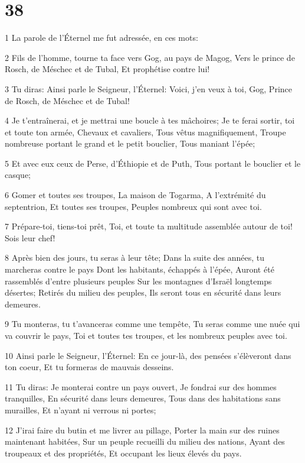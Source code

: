 \chapter{38}

\par 1 La parole de l'Éternel me fut adressée, en ces mots:
\par 2 Fils de l'homme, tourne ta face vers Gog, au pays de Magog, Vers le prince de Rosch, de Méschec et de Tubal, Et prophétise contre lui!
\par 3 Tu diras: Ainsi parle le Seigneur, l'Éternel: Voici, j'en veux à toi, Gog, Prince de Rosch, de Méschec et de Tubal!
\par 4 Je t'entraînerai, et je mettrai une boucle à tes mâchoires; Je te ferai sortir, toi et toute ton armée, Chevaux et cavaliers, Tous vêtus magnifiquement, Troupe nombreuse portant le grand et le petit bouclier, Tous maniant l'épée;
\par 5 Et avec eux ceux de Perse, d'Éthiopie et de Puth, Tous portant le bouclier et le casque;
\par 6 Gomer et toutes ses troupes, La maison de Togarma, A l'extrémité du septentrion, Et toutes ses troupes, Peuples nombreux qui sont avec toi.
\par 7 Prépare-toi, tiens-toi prêt, Toi, et toute ta multitude assemblée autour de toi! Sois leur chef!
\par 8 Après bien des jours, tu seras à leur tête; Dans la suite des années, tu marcheras contre le pays Dont les habitants, échappés à l'épée, Auront été rassemblés d'entre plusieurs peuples Sur les montagnes d'Israël longtemps désertes; Retirés du milieu des peuples, Ils seront tous en sécurité dans leurs demeures.
\par 9 Tu monteras, tu t'avanceras comme une tempête, Tu seras comme une nuée qui va couvrir le pays, Toi et toutes tes troupes, et les nombreux peuples avec toi.
\par 10 Ainsi parle le Seigneur, l'Éternel: En ce jour-là, des pensées s'élèveront dans ton coeur, Et tu formeras de mauvais desseins.
\par 11 Tu diras: Je monterai contre un pays ouvert, Je fondrai sur des hommes tranquilles, En sécurité dans leurs demeures, Tous dans des habitations sans murailles, Et n'ayant ni verrous ni portes;
\par 12 J'irai faire du butin et me livrer au pillage, Porter la main sur des ruines maintenant habitées, Sur un peuple recueilli du milieu des nations, Ayant des troupeaux et des propriétés, Et occupant les lieux élevés du pays.
